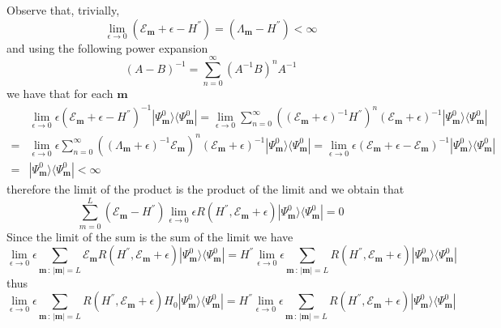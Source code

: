 \documentclass[10pt]{article}
\numberwithin{equation}{section}
\numberwithin{equation}{subsection}
\begin{document}
Observe that, trivially,
\begin{equation}
	\lim_{\epsilon\to 0}\left(\mathcal{E}_{\bm{m}}+\epsilon-H^{''}\right)=\left(\Lambda_{\bm{m}}-H^{''}\right)<\infty
\end{equation}
and using the following power expansion
\begin{equation}\label{veryUsefulSeries}
	(A-B)^{-1}=\sum_{n=0}^{\infty}(A^{-1}B)^{n}A^{-1}
\end{equation}
we have that for each $\bm{m}$ 
\begin{equation}
	\begin{split}
		&\lim_{\epsilon\to 0}\epsilon\left(\mathcal{E}_{\bm{m}}+\epsilon-H^{''}\right)^{-1}|\Psi_{\bm{m}}^{0}\rangle\langle\Psi_{\bm{m}}^{0}|=\lim_{\epsilon\to 0}\sum_{n=0}^{\infty}\left((\mathcal{E}_{\bm{m}}+\epsilon)^{-1}H^{''}\right)^{n}(\mathcal{E}_{\bm{m}}+\epsilon)^{-1}|\Psi_{\bm{m}}^{0}\rangle\langle\Psi_{\bm{m}}^{0}|
		\\=&
		\lim_{\epsilon\to 0}\epsilon\sum_{n=0}^{\infty}\left((\Lambda_{\bm{m}}+\epsilon)^{-1}\mathcal{E}_{\bm{m}}\right)^{n}(\mathcal{E}_{\bm{m}}+\epsilon)^{-1}|\Psi_{\bm{m}}^{0}\rangle\langle\Psi_{\bm{m}}^{0}|=\lim_{\epsilon\to 0}\epsilon\left(\mathcal{E}_{\bm{m}}+\epsilon-\mathcal{E}_{\bm{m}}\right)^{-1}|\Psi_{\bm{m}}^{0}\rangle\langle\Psi_{\bm{m}}^{0}|\\=&|\Psi_{\bm{m}}^{0}\rangle\langle\Psi_{\bm{m}}^{0}|<\infty
	\end{split}
\end{equation}
therefore the limit of the product is the product of the limit and we obtain that 
\begin{equation}
	\sum_{m=0}^{L}  (\mathcal{E}_{\bm{m}}-H^{''})\lim_{\epsilon\to 0}\epsilon R(H^{''},\mathcal{E}_{\bm{m}}+\epsilon)|\Psi_{\bm{m}}^{0}\rangle \langle \Psi_{\bm{m}}^{0}|=0
\end{equation}
Since the limit of the sum is the sum of the limit we have   
\begin{equation}
	\lim_{\epsilon\to 0}\epsilon\sum_{\bm{m}\,:\, |\bm{m}|=L}  \mathcal{E}_{\bm{m}}R(H^{''},\mathcal{E}_{\bm{m}}+\epsilon)|\Psi_{\bm{m}}^{0}\rangle \langle \Psi_{\bm{m}}^{0}|= H^{''}\lim_{\epsilon\to 0}\epsilon\sum_{\bm{m}\,:\, |\bm{m}|=L}  R(H^{''},\mathcal{E}_{\bm{m}}+\epsilon)|\Psi_{\bm{m}}^{0}\rangle \langle \Psi_{\bm{m}}^{0}|
\end{equation}
thus 
\begin{equation}
	\lim_{\epsilon\to 0}\epsilon\sum_{\bm{m}\,:\,|\bm{m}|=L}  R(H^{''},\mathcal{E}_{\bm{m}}+\epsilon)H_{0}|\Psi_{\bm{m}}^{0}\rangle \langle \Psi_{\bm{m}}^{0}|= H^{''}\lim_{\epsilon\to 0}\epsilon\sum_{\bm{m}\,:\,|\bm{m}|=L}  R(H^{''},\mathcal{E}_{\bm{m}}+\epsilon)|\Psi_{\bm{m}}^{0}\rangle \langle \Psi_{\bm{m}}^{0}|
\end{equation}
\end{document}
